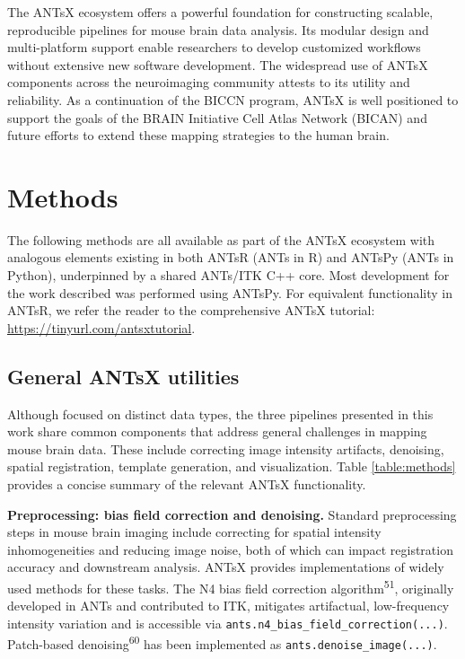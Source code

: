 \documentclass[
  12pt,
]{article}
\begin{document}
The ANTsX ecosystem offers a powerful foundation for constructing
scalable, reproducible pipelines for mouse brain data analysis. Its
modular design and multi-platform support enable researchers to develop
customized workflows without extensive new software development. The
widespread use of ANTsX components across the neuroimaging community
attests to its utility and reliability. As a continuation of the BICCN
program, ANTsX is well positioned to support the goals of the BRAIN
Initiative Cell Atlas Network (BICAN) and future efforts to extend these
mapping strategies to the human brain.

\clearpage \newpage

\section{Methods}\label{methods}

The following methods are all available as part of the ANTsX ecosystem
with analogous elements existing in both ANTsR (ANTs in R) and ANTsPy
(ANTs in Python), underpinned by a shared ANTs/ITK C++ core. Most
development for the work described was performed using ANTsPy. For
equivalent functionality in ANTsR, we refer the reader to the
comprehensive ANTsX tutorial: \url{https://tinyurl.com/antsxtutorial}.

\subsection{General ANTsX utilities}\label{general-antsx-utilities}

Although focused on distinct data types, the three pipelines presented
in this work share common components that address general challenges in
mapping mouse brain data. These include correcting image intensity
artifacts, denoising, spatial registration, template generation, and
visualization. Table \ref{table:methods} provides a concise summary of
the relevant ANTsX functionality.



\textbf{Preprocessing: bias field correction and denoising.} Standard
preprocessing steps in mouse brain imaging include correcting for
spatial intensity inhomogeneities and reducing image noise, both of
which can impact registration accuracy and downstream analysis. ANTsX
provides implementations of widely used methods for these tasks. The N4
bias field correction algorithm\textsuperscript{51}, originally
developed in ANTs and contributed to ITK, mitigates artifactual,
low-frequency intensity variation and is accessible via
\texttt{ants.n4\_bias\_field\_correction(...)}. Patch-based
denoising\textsuperscript{60} has been implemented as
\texttt{ants.denoise\_image(...)}.
\end{document}
